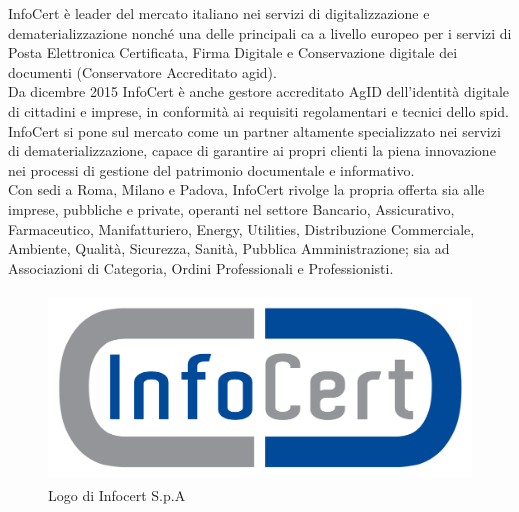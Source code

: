 InfoCert è leader del mercato italiano nei servizi di digitalizzazione e dematerializzazione nonché una delle principali \gls{ca} a livello europeo per i servizi di Posta Elettronica Certificata, Firma Digitale e Conservazione digitale dei documenti (Conservatore Accreditato \gls{agid}).\\
Da dicembre 2015 InfoCert è anche gestore accreditato AgID dell’identità digitale di cittadini e imprese, in conformità ai requisiti regolamentari e tecnici dello \gls{spid}. \\
InfoCert si pone sul mercato come un partner altamente specializzato nei servizi di dematerializzazione, capace di garantire ai propri clienti la piena innovazione nei processi di gestione del patrimonio documentale e informativo. \\
Con sedi a Roma, Milano e Padova, InfoCert rivolge la propria offerta sia alle imprese, pubbliche e private, operanti nel settore Bancario, Assicurativo, Farmaceutico, Manifatturiero, Energy, Utilities, Distribuzione Commerciale, Ambiente, Qualità, Sicurezza, Sanità, Pubblica Amministrazione; sia ad Associazioni di Categoria, Ordini Professionali e Professionisti.
\begin{figure}[h]
	\centering
	\includegraphics[height=5cm]{immagini/logo-infocert}
	\caption{Logo di Infocert S.p.A}
	\label{img-infocert-logo}
\end{figure}